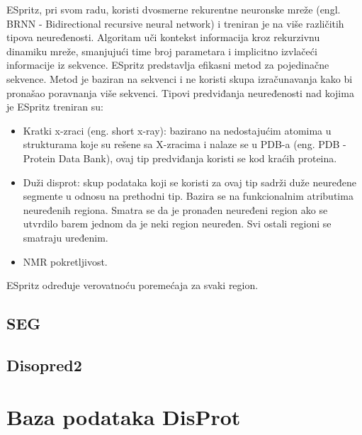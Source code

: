 ESpritz, pri svom radu, koristi dvosmerne rekurentne neuronske mreže (engl. BRNN - Bidirectional recursive neural network) i treniran je na više različitih tipova neuređenosti. Algoritam uči kontekst informacija kroz rekurzivnu dinamiku mreže, smanjujući time broj parametara i implicitno izvlačeći informacije iz sekvence. ESpritz predstavlja efikasni metod za pojedinačne sekvence. Metod je baziran na sekvenci i ne koristi skupa izračunavanja kako bi pronašao poravnanja više sekvenci. Tipovi predviđanja neuređenosti nad kojima je ESpritz treniran su:
\begin{itemize}
\item Kratki x-zraci (eng. short x-ray): bazirano na nedostajućim atomima u strukturama koje su rešene sa X-zracima i nalaze se u PDB-a (eng. PDB - Protein Data Bank), ovaj tip predviđanja koristi se kod kraćih proteina. 
\item Duži disprot: skup podataka koji se koristi za ovaj tip sadrži duže neuređene segmente u odnosu na prethodni tip. Bazira se na funkcionalnim atributima neuređenih regiona. Smatra se da je pronađen neuređeni region ako se utvrdilo barem jednom da je neki region neuređen. Svi ostali regioni se smatraju uređenim.
\item NMR pokretljivost.
\end{itemize}
ESpritz određuje verovatnoću poremećaja za svaki region. ~\cite{ESpritzAFPD, ESpritzEP, ESpritz2, ESpritz3}

\subsection{SEG}

\subsection{Disopred2}


\section{Baza podataka DisProt}

